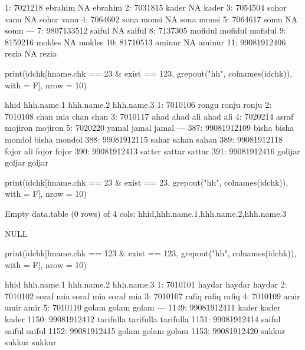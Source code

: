 \begin{Schunk}
\begin{Soutput}
 1:     7021218    ebrahim         NA    ebrahim
 2:     7031815      kader         NA      kader
 3:     7054504 sohor vanu         NA sohor vanu
 4:     7064602 sona monsi         NA sona monsi
 5:     7064617       somu         NA       somu
---                                             
 7:  9807133512     saiful         NA     saiful
 8:     7137305    mofidul    mofidul    mofidul
 9:     8159216     mokles         NA     mokles
10:    81710513     aminur         NA     aminur
11: 99081912406      rezia         NA      rezia
\end{Soutput}
\begin{Sinput}
print(idchk[hname.chk == 23  & exist == 123, 
	grepout("hh", colnames(idchk)), with = F], nrow = 10)
\end{Sinput}
\begin{Soutput}
            hhid hhh.name.1   hhh.name.2   hhh.name.3
  1:     7010106      rongu        ronju        ronju
  2:     7010108   chan mia         chan         chan
  3:     7010117       ahad     ahad ali     ahad ali
  4:     7020214      asraf      mojiron      mojiron
  5:     7020220      yamal        jamal        jamal
 ---                                                 
387: 99081912109      bisha bisha mondol bisha mondol
388: 99081912115      sahar        sahan        sahan
389: 99081912118  fojor ali        fojor        fojor
390: 99081912413     satter       sattar       sattar
391: 99081912416    golijar       goljar       goljar
\end{Soutput}
\begin{Sinput}
print(idchk[hname.chk == 23  & exist == 23, 
	grepout("hh", colnames(idchk)), with = F], nrow = 10)
\end{Sinput}
\begin{Soutput}
Empty data.table (0 rows) of 4 cols: hhid,hhh.name.1,hhh.name.2,hhh.name.3
\end{Soutput}
\begin{Soutput}
NULL
\end{Soutput}
\begin{Sinput}
print(idchk[hname.chk == 123  & exist == 123, 
	grepout("hh", colnames(idchk)), with = F], nrow = 10)
\end{Sinput}
\begin{Soutput}
             hhid hhh.name.1 hhh.name.2 hhh.name.3
   1:     7010101     haydar     haydar     haydar
   2:     7010102  soraf mia  soraf mia  soraf mia
   3:     7010107      rafiq      rafiq      rafiq
   4:     7010109       amir       amir       amir
   5:     7010110      golam      golam      golam
  ---                                             
1149: 99081912411      kader      kader      kader
1150: 99081912412  tarifulla  tarifulla  tarifulla
1151: 99081912414     saiful     saiful     saiful
1152: 99081912415      golam      golam      golam
1153: 99081912420     sukkur     sukkur     sukkur
\end{Soutput}
\end{Schunk}
